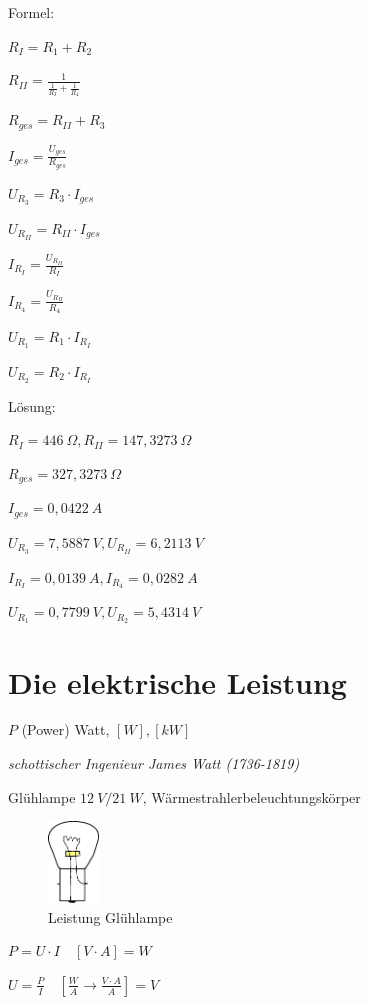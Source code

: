 Formel:

$R_I = R_1 + R_2$

$R_{II} = \frac{1}{\frac{1}{R_I} + \frac{1}{R_4}}$

$R_{ges} = R_{II} + R_3$

$I_{ges} = \frac{U_{ges}}{R_{ges}}$

$U_{R_3} = R_3 \cdot I_{ges}$

$U_{R_{II}} = R_{II} \cdot I_{ges}$

$I_{R_I} = \frac{U_{R_{II}}}{R_I}$

$I_{R_4} = \frac{U_{R_{II}}}{R_4}$

$U_{R_1} = R_1 \cdot I_{R_I}$

$U_{R_2} = R_2 \cdot I_{R_I}$

Lösung:

$R_I = 446~\Omega, R_{II} = 147,3273~\Omega$

$R_{ges} = 327,3273~\Omega$

$I_{ges} = 0,0422~A$

$U_{R_3} = 7,5887~V, U_{R_{II}} = 6,2113~V$

$I_{R_I} = 0,0139~A, I_{R_4} = 0,0282~A$

$U_{R_1} = 0,7799~V, U_{R_2} = 5,4314~V$

\newpage

\section{Die elektrische Leistung}\label{die-elektrische-leistung}

$P$ (Power) Watt, $[W], [kW]$

\emph{schottischer Ingenieur James Watt (1736-1819)}

Glühlampe $12~V/21~W$, Wärmestrahlerbeleuchtungskörper

\begin{figure}[!ht]%
\centering
\includegraphics[width=0.12\textwidth]{images/Skizze/26_Leistung_Gluehlampe.pdf}
\caption{Leistung Glühlampe}
\end{figure}

$\boxed{P = U \cdot I} \quad [V \cdot A] = W$

$\boxed{U = \frac{P}{I}} \quad [\frac{W}{A} \to \frac{V \cdot A}{A}] = V$


